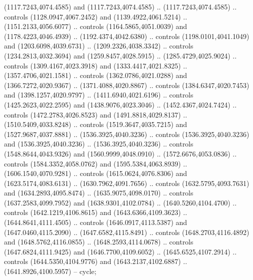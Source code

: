 \begin{scope}[shift={(-343.28256,-575.56596)}]
\begin{scope}[shift={(-736.04956,-3272.8657)}]
      (1117.7243,4074.4585) and (1117.7243,4074.4585) .. (1117.7243,4074.4585) ..
      controls (1128.0947,4067.2452) and (1139.4922,4061.5214) ..
      (1151.2133,4056.6077) .. controls (1164.5865,4051.0039) and
      (1178.4223,4046.4939) .. (1192.4374,4042.6380) .. controls
      (1198.0101,4041.1049) and (1203.6098,4039.6731) .. (1209.2326,4038.3342) ..
      controls (1234.2813,4032.3694) and (1259.8457,4028.5915) ..
      (1285.4729,4025.9024) .. controls (1309.4167,4023.3918) and
      (1333.4417,4021.8325) .. (1357.4706,4021.1581) .. controls
      (1362.0786,4021.0288) and (1366.7272,4020.9367) .. (1371.4088,4020.8867) ..
      controls (1384.6347,4020.7453) and (1398.1257,4020.9797) ..
      (1411.6940,4021.6196) .. controls (1425.2623,4022.2595) and
      (1438.9076,4023.3046) .. (1452.4367,4024.7424) .. controls
      (1472.2783,4026.8523) and (1491.8818,4029.8137) .. (1510.5409,4033.8248) ..
      controls (1519.3647,4035.7215) and (1527.9687,4037.8881) ..
      (1536.3925,4040.3236) .. controls (1536.3925,4040.3236) and
      (1536.3925,4040.3236) .. (1536.3925,4040.3236) .. controls
      (1548.8644,4043.9326) and (1560.9999,4048.0910) .. (1572.6676,4053.0836) ..
      controls (1584.3352,4058.0762) and (1595.5384,4063.8939) ..
      (1606.1540,4070.9281) .. controls (1615.0624,4076.8306) and
      (1623.5174,4083.6131) .. (1630.7962,4091.7656) .. controls
      (1632.5795,4093.7631) and (1634.2893,4095.8474) .. (1635.9075,4098.0170) ..
      controls (1637.2583,4099.7952) and (1638.9301,4102.0784) ..
      (1640.5260,4104.4700) .. controls (1642.1219,4106.8615) and
      (1643.6366,4109.3623) .. (1644.8641,4111.4505) .. controls
      (1646.0917,4113.5387) and (1647.0460,4115.2090) .. (1647.6582,4115.8491) ..
      controls (1648.2703,4116.4892) and (1648.5762,4116.0855) ..
      (1648.2593,4114.0678) .. controls (1647.6824,4111.9425) and
      (1646.7700,4109.6052) .. (1645.6525,4107.2914) .. controls
      (1644.5350,4104.9776) and (1643.2137,4102.6887) .. (1641.8926,4100.5957) --
      cycle;


\end{scope}
\end{scope}

